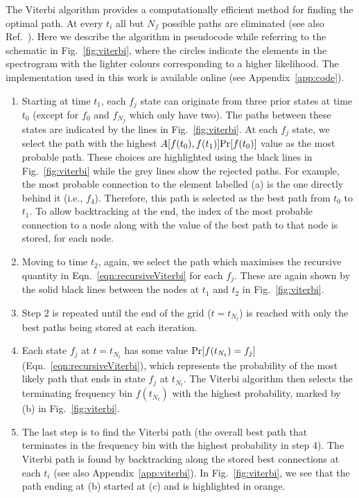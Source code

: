 \documentclass[paper-main.tex]{subfiles}
\begin{document}
The Viterbi algorithm provides a computationally efficient method for finding the optimal path. 
At every $t_i$ all but $N_f$ possible paths are eliminated (see also Ref.~\cite{ScoX1ViterbiO1:2017}). 
Here we describe the algorithm in pseudocode while referring to the schematic in Fig.~\ref{fig:viterbi}, where the circles indicate the elements in the spectrogram with the lighter colours corresponding to a higher likelihood. The implementation used in this work is available online (see Appendix~\ref{app:code}).
\begin{enumerate}
\item Starting at time $t_1$, each $f_j$ state can originate from three prior states at time $t_0$ (except for $f_0$ and $f_{N_f}$ which only have two). The paths between these states are indicated by the lines in Fig.~\ref{fig:viterbi}. At each $f_j$ state, we select the path with the highest $A[f(t_0),f(t_1)] {\rm Pr}[f(t_0)]$ value as the most probable path. These choices are highlighted using the black lines in Fig.~\ref{fig:viterbi} while the grey lines show the rejected paths. For example, the most probable connection to the element labelled (a) is the one directly behind it (i.e., $f_4$). Therefore, this path is selected as the best path from $t_0$ to $t_1$. To allow backtracking at the end, the index of the most probable connection to a node along with the value of the best path to that node is stored, for each node.

\item Moving to time $t_2$, again, we select the path which maximises the recursive quantity in Eqn.~\ref{eqn:recursiveViterbi} for each $f_j$. These are again shown by the solid black lines between the nodes at $t_1$ and $t_2$ in Fig.~\ref{fig:viterbi}.

\item Step 2 is repeated until the end of the grid ($t=t_{N_t}$) is reached with only the best paths being stored at each iteration. 

\item Each state $f_j$ at $t=t_{N_t}$ has some value ${\rm Pr}[f(t_{N_t})=f_j]$ (Eqn.~\ref{eqn:recursiveViterbi}), which represents the probability of the most likely path that ends in state $f_j$ at $t_{N_t}$. The Viterbi algorithm then selects the terminating frequency bin $f(t_{N_t})$ with the highest probability, marked by (b) in Fig.~\ref{fig:viterbi}.

\item The last step is to find the Viterbi path (the overall best path that terminates in the frequency bin with the highest probability in step 4). The Viterbi path is found by backtracking along the stored best connections at each $t_i$ (see also Appendix~\ref{app:viterbi}). In Fig.~\ref{fig:viterbi}, we see that the path ending at (b) started at (c) and is highlighted in orange.
\end{enumerate}
\end{document}
